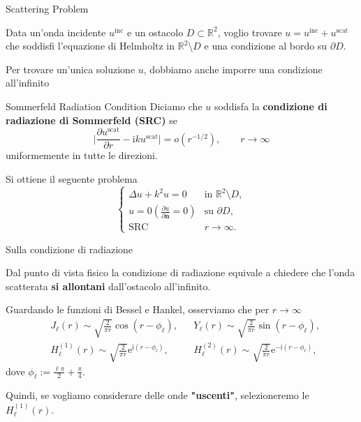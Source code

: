 \documentclass{beamer}
\newcommand{\IR}{{\mathbb R}}
\newcommand{\bn}{{\mathbf n}}
\newcommand{\inc}{{\mathrm{inc}}}
\newcommand{\scat}{{\mathrm{scat}}}
\newcommand{\ri}{{\mathrm i}}
\newcommand{\re}{{\mathrm e}}
\begin{document}
	\begin{frame}{Scattering Problem}
		\begin{small}
			Data un'onda incidente $u^\inc$ e un ostacolo $D\subset \IR^2$, voglio trovare $u = u^\inc + u^\scat$ \\che soddisfi l'equazione di Helmholtz in $\IR^2 \setminus D$ e una condizione al bordo su $\partial D$.
		
		Per trovare un'unica soluzione $u$, dobbiamo anche imporre una condizione all'infinito
		\begin{block}{Sommerfeld Radiation Condition}
			Diciamo che $u$ soddisfa la \textbf{condizione di radiazione di Sommerfeld (SRC)} se
			\begin{equation*}
				\bigg|\frac{\partial u^\scat}{\partial r} - \ri ku^\scat\bigg| = o(r^{-1/2}), \qquad r \to \infty
			\end{equation*}
			uniformemente in tutte le direzioni.
		\end{block}
		Si ottiene il seguente problema
		\begin{equation*}
			\begin{cases}
				\Delta u + k^2 u = 0 & \text{in} \,\, \IR^2 \setminus D, \\
				u = 0 \left( \frac{\partial u}{\partial \bn}=0 \right) & \text{su} \,\, \partial D, \\
				\text{SRC} & r \to \infty.
			\end{cases}
		\end{equation*}
		\end{small}
	\end{frame}
	
	\begin{frame}{Sulla condizione di radiazione}
		\begin{small}
		\begin{block}{}
			Dal punto di vista fisico la condizione di radiazione equivale a chiedere che l'onda scatterata \textbf{si allontani} dall'ostacolo all'infinito.
		\end{block}
		
		Guardando le funzioni di Bessel e Hankel, osserviamo che per $r\to\infty$
		\begin{align*}
			& J_\ell(r) \sim \sqrt{\frac{2}{\pi r}} \cos(r - \phi_\ell), & & Y_\ell(r) \sim \sqrt{\frac{2}{\pi r}} \sin(r - \phi_\ell), \\
			& H_\ell^{(1)}(r) \sim \sqrt{\frac{2}{\pi r}}  \re^{\ri (r - \phi_\ell)}, & & H_\ell^{(2)}(r) \sim \sqrt{\frac{2}{\pi r}}  \re^{-\ri (r - \phi_\ell)},
		\end{align*}
		dove $\phi_\ell := \frac{\ell \pi}{2}+\frac{\pi}{4}$.
		
		Quindi, se vogliamo considerare delle onde \textbf{"uscenti"}, selezioneremo le $H_\ell^{(1)}(r)$.
		\end{small}
	\end{frame}
	
\end{document}
